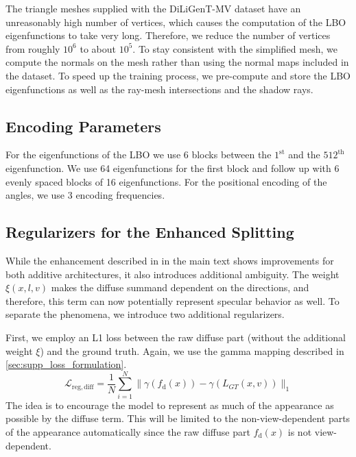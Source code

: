 The triangle meshes supplied with the DiLiGenT-MV dataset \cite{Li2020DiLiGentMVDataset} have an unreasonably high number of vertices, which causes the computation of the LBO eigenfunctions to take very long. Therefore, we reduce the number of vertices from roughly $10^6$ to about $10^5$. To stay consistent with the simplified mesh, we compute the normals on the mesh rather than using the normal maps included in the dataset. To speed up the training process, we pre-compute and store the LBO eigenfunctions as well as the ray-mesh intersections and the shadow rays.


\subsection{Encoding Parameters}
\label{sec:supp_lbo_params}

For the eigenfunctions of the LBO we use 6 blocks between the $1^\mathrm{st}$ and the $512^\mathrm{th}$ eigenfunction. We use 64 eigenfunctions for the first block and follow up with 6 evenly spaced blocks of 16 eigenfunctions. For the positional encoding of the angles, we use 3 encoding frequencies.


\subsection{Regularizers for the Enhanced Splitting}
\label{sec:supp:regularizers_enhanced}

While the enhancement described in
\iftoggle{arxiv}{\cref{sec:enhancingAddSplit}}{Sec. 4.4}
in the main text shows improvements for both additive architectures, it also introduces additional ambiguity. The weight $\xi(x, l, v)$ makes the diffuse summand dependent on the directions, and therefore, this term can now potentially represent specular behavior as well. To separate the phenomena, we introduce two additional regularizers. 

First, we employ an L1 loss between the raw diffuse part (without the additional weight $\xi$) and the ground truth. Again, we use the gamma mapping described in \cref{sec:supp_loss_formulation}.
\begin{equation}
    \mathcal{L}_\mathrm{reg,diff} = \frac{1}{N}\sum_{i=1}^N \|\gamma(f_\text{d}(x)) - \gamma(L_{GT}(x, v))\|_1
\end{equation}
The idea is to encourage the model to represent as much of the appearance as possible by the diffuse term. This will be limited to the non-view-dependent parts of the appearance automatically since the raw diffuse part $f_\text{d}(x)$ is not view-dependent.

